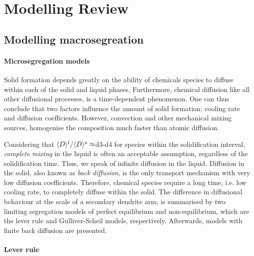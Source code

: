 \chapter{Modelling Review}
\begin{nolinkcolors} 
\minitoc
\end{nolinkcolors}
\newpage

\section{Modelling macrosegreation}
%
\subsubsection{Microsegregation models}
Solid formation depends greatly on the ability of chemicals species to diffuse within each of 
the solid and liquid phases, %
Furthermore, chemical diffusion like all other 
diffusional processes, is a time-dependent phenomenon. One can thus conclude that two factors
influence the amount of solid formation: cooling rate and diffusion coefficients. However, 
convection and other mechanical mixing sources, homogenise the composition much faster than atomic diffusion. 

Considering that $\langle D \rangle^l/\langle D \rangle^s\approx$\num{d3}-\num{d4} for species within the solidification interval, \emph{complete mixing} in the liquid is often an acceptable assumption, regardless of the 
solidification time. Thus, we speak of infinite diffusion in the liquid. Diffusion in the solid, 
also known as \emph{back diffusion}, is the only transport mechanism with very low diffusion coefficients. 
Therefore, chemical species require a long time, i.e. low cooling rate, to completely diffuse within the solid.
The difference in diffusional behaviour at the scale of a secondary dendrite arm, is summarised by two limiting 
segregation models of perfect equilibrium  and non-equilibrium, which are the lever rule and Gulliver-Scheil models, respectively. 
Afterwards, models with finite back diffusion are presented. 

\subsubsection*{Lever rule}

